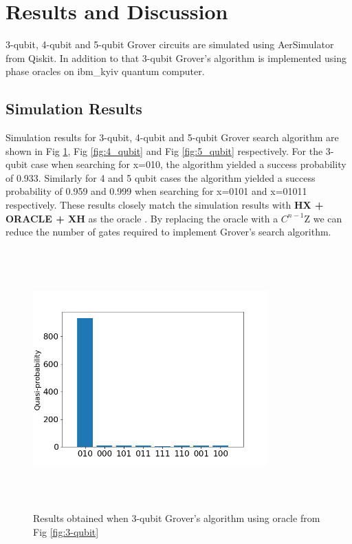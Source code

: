 \documentclass[conference]{IEEEtran}
\begin{document}
\section{Results and Discussion}
3-qubit, 4-qubit and 5-qubit Grover circuits are simulated using AerSimulator from Qiskit. In addition to that 3-qubit Grover's algorithm is implemented using phase oracles \cite{b3} on ibm\_kyiv quantum computer.

\subsection{Simulation Results}
Simulation results for 3-qubit, 4-qubit and 5-qubit Grover
search algorithm are shown in Fig \ref{fig:3_qubit}, Fig \ref{fig:4_qubit} and Fig \ref{fig:5_qubit} respectively. For the 3-qubit case when searching for x=010, the algorithm yielded a success probability of 0.933. Similarly for 4 and 5 qubit cases the algorithm yielded a success probability of 0.959 and 0.999 when searching for x=0101 and x=01011 respectively. These results closely match the simulation results with \textbf{HX + ORACLE + XH} as the oracle \cite{b15}. By replacing the oracle with a $C^{n-1}$Z we can reduce the number of gates required to implement Grover's search algorithm.

\begin{figure}[htbp]
	\centerline{\includegraphics[width=9cm,height=10cm,keepaspectratio]{3_qubit.png}}
	\caption{Results obtained when 3-qubit Grover's algorithm using oracle from Fig \ref{fig:3-qubit}}
	\label{fig:3_qubit}
\end{figure}
\end{document}
